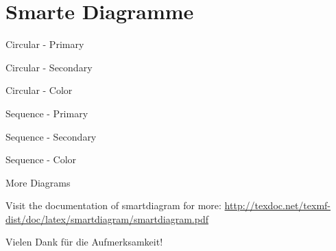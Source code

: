 \documentclass[aspectratio=169, ngerman]{udeddi}
\begin{document}
\section{Smarte Diagramme}
\begin{frame}{Circular - Primary}
\begin{center}
\end{center}
\end{frame}

\begin{frame}{Circular - Secondary}
\begin{center}
\end{center}
\end{frame}

\begin{frame}{Circular - Color}
\begin{center}
\end{center}
\end{frame}

\begin{frame}{Sequence - Primary}
\begin{center}
\end{center}
\end{frame}

\begin{frame}{Sequence - Secondary}
\begin{center}
\end{center}
\end{frame}

\begin{frame}{Sequence - Color}
\begin{center}
\end{center}
\end{frame}

\begin{frame}{More Diagrams}
    \begin{center}
        Visit the documentation of smartdiagram for more: 
        \url{http://texdoc.net/texmf-dist/doc/latex/smartdiagram/smartdiagram.pdf}
    \end{center}
\end{frame}

\begin{contactFrame}{\insertauthor}{\insertchair}{\insertorganisation}{\insertaddress}{\insertmail}{\insertwebsite}
    Vielen Dank für die Aufmerksamkeit!
\end{contactFrame}

\appendix

\begin{bibFrame}[Literaturverzeichnis]
    \printbibliography[heading=none]
\end{bibFrame}
\end{document}
